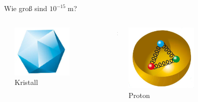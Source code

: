 \documentclass{beamer}
\newcommand{\m}{\ensuremath{\;\text{m}}\xspace}
\begin{document}
\begin{frame}
\begin{columns}[T]
\begin{column}{0.25\textwidth}
    \end{column}
    \begin{column}{0.75\textwidth}
      \centering
      \alert{Wie gro\ss{} sind $10^{-15}\m$?}
      \begin{columns}
        \begin{column}{0.1\textwidth}
        \end{column}
        \begin{column}{0.35\textwidth}
          \centering
          \includegraphics[width=0.6\textwidth]{matter/Kristall.png}\\
          Kristall
        \end{column}
        \begin{column}{0.1\textwidth}
          \centering
          {\Huge :}
        \end{column}
        \begin{column}{0.35\textwidth}
          \centering
          \includegraphics[width=0.6\textwidth]{matter/Proton.png}\\
          Proton
        \end{column}
        \begin{column}{0.1\textwidth}

\end{column}
\end{columns}
\end{column}
\end{columns}
\end{frame}
\end{document}
